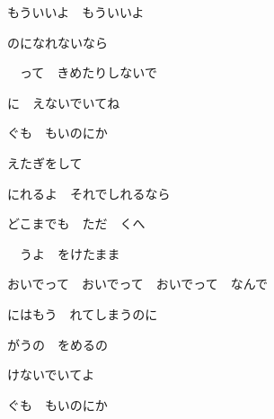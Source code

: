 \documentclass[a4paper,tate,twocolumn,12pt]{ltjtarticle}
\begin{document}
\begin{flushleft}
\begin{minipage}{\linewidth}
もういいよ　もういいよ

のになれないなら
\end{minipage}

\vspace{2em}

\noindent\begin{minipage}{\linewidth}
　って　きめたりしないで

に　えないでいてね
\end{minipage}

\vspace{2em}

\noindent\begin{minipage}{\linewidth}
ぐも　もいのにか

えたぎをして

にれるよ　それでしれるなら

どこまでも　ただ　くへ
\end{minipage}

\vspace{2em}

\noindent\begin{minipage}{\linewidth}
　うよ　をけたまま

おいでって　おいでって　おいでって　なんで

にはもう　れてしまうのに
\end{minipage}

\vspace{3em}

\noindent\begin{minipage}{\linewidth}
がうの　をめるの

けないでいてよ
\end{minipage}

\vspace{2em}

\noindent\begin{minipage}{\linewidth}
ぐも　もいのにか


\end{minipage}
\end{flushleft}
\end{document}
